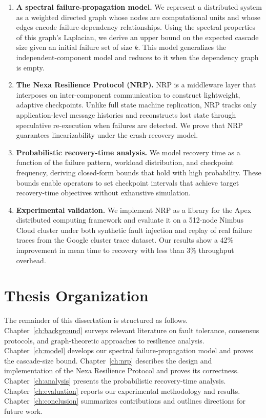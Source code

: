 \documentclass[12pt,letterpaper,oneside]{report}
\begin{document}
\begin{enumerate}[label=\textbf{C\arabic*:},leftmargin=*,itemsep=6pt]
  \item \textbf{A spectral failure-propagation model.} We represent a distributed system as a weighted directed graph whose nodes are computational units and whose edges encode failure-dependency relationships. Using the spectral properties of this graph's Laplacian, we derive an upper bound on the expected cascade size given an initial failure set of size $k$. This model generalizes the independent-component model and reduces to it when the dependency graph is empty.
  
  \item \textbf{The Nexa Resilience Protocol (NRP).} NRP is a middleware layer that interposes on inter-component communication to construct lightweight, adaptive checkpoints. Unlike full state machine replication, NRP tracks only application-level message histories and reconstructs lost state through speculative re-execution when failures are detected. We prove that NRP guarantees linearizability under the crash-recovery model.
  
  \item \textbf{Probabilistic recovery-time analysis.} We model recovery time as a function of the failure pattern, workload distribution, and checkpoint frequency, deriving closed-form bounds that hold with high probability. These bounds enable operators to set checkpoint intervals that achieve target recovery-time objectives without exhaustive simulation.
  
  \item \textbf{Experimental validation.} We implement NRP as a library for the Apex distributed computing framework and evaluate it on a 512-node Nimbus Cloud cluster under both synthetic fault injection and replay of real failure traces from the Google cluster trace dataset. Our results show a 42\% improvement in mean time to recovery with less than 3\% throughput overhead.
\end{enumerate}

\section{Thesis Organization}

The remainder of this dissertation is structured as follows. Chapter~\ref{ch:background} surveys relevant literature on fault tolerance, consensus protocols, and graph-theoretic approaches to resilience analysis. Chapter~\ref{ch:model} develops our spectral failure-propagation model and proves the cascade-size bound. Chapter~\ref{ch:nrp} describes the design and implementation of the Nexa Resilience Protocol and proves its correctness. Chapter~\ref{ch:analysis} presents the probabilistic recovery-time analysis. Chapter~\ref{ch:evaluation} reports our experimental methodology and results. Chapter~\ref{ch:conclusion} summarizes contributions and outlines directions for future work.
\end{document}
